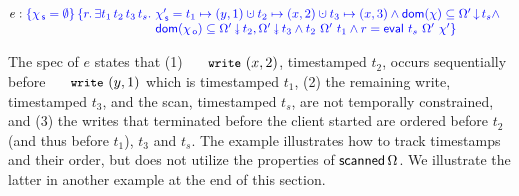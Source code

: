 \[
\!\!\!\begin{array}{l}
e : 
  \tsPre{\{ \histS = \hempty \}}
\!\!\begin{array}[t]{l}
  \tsPos{\{ r\ldot \exists t_1\, t_2\, t_3\, t_s \ldot\,
    \histS' = t_1 \hpts (y,1) \hunion t_2 
    \hpts (x,2) \hunion t_3 \hpts (x,3)\wedge
    \dom{\hist} \subseteq \ideal{\stableorderP}{t_s}\wedge\!}\\
  \tsPos{\hphantom{\{ r\ldot \exists t_1\, t_2\, t_3\, t_s \ldot}\, 
    \dom{\histO} \subseteq \sideal{\stableorderP}{t_2},
    \sideal{\stableorderP}{t_3} \wedge 
%
    t_2\ {\stableorderP}\ t_1 \wedge r = \eval\ t_s\ \stableorderP\ \histP \}}\\
\end{array}
\end{array}
\]

The spec of $e$ states that (1) $\esc{write}~(x,2)$, timestamped
$t_2$, occurs sequentially before $\esc{write}~(y,1)$ which is
timestamped $t_1$, (2) the remaining write, timestamped $t_3$, and the
scan, timestamped $t_s$, are not temporally constrained, and (3) the
writes that terminated before the client started are ordered before
$t_2$ (and thus before $t_1$), $t_3$ and $t_s$. The example
illustrates how to track timestamps and their order, but does not
utilize the properties of $\mathsf{scanned}\,\Omega$. We illustrate the
latter in another example at the end of this section.

